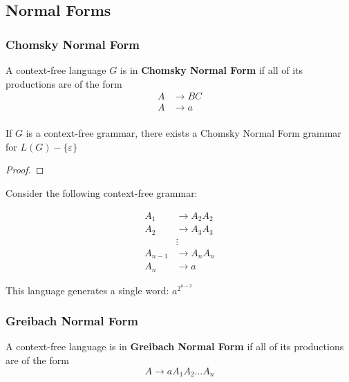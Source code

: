 \subsection{Normal Forms}\label{subsec:normal-forms}
\subsubsection{Chomsky Normal Form}\label{subsubsec:chomsky-normal-form}
\begin{definition}
    A context-free language $G$ is in \textbf{Chomsky Normal Form} if all of its productions are of the form 
    \begin{align*}A &\to BC\\
                  A &\to a\\
    \end{align*}
\end{definition}

\begin{theorem}
    If \(G\) is a context-free grammar, there exists a Chomsky Normal Form grammar for \(L(G)-\{\varepsilon \} \)
\end{theorem}

\begin{proof}

\end{proof}



Consider the following context-free grammar:

\begin{align*}
    A_1 &\to A_2A_2\\
    A_2 &\to A_3A_3\\
        &\vdots\\
    A_{n-1}&\to A_nA_n\\
    A_n &\to a
\end{align*}

This language generates a single word: \(a^{2^{n-2}}\)

\subsubsection{Greibach Normal Form}\label{subsubsec:greibach-normal-form}
\begin{definition}
    A context-free language is in \textbf{Greibach Normal Form} if all of its productions are of the form
    \[A\to aA_1A_2\hdots A_n\]
\end{definition}